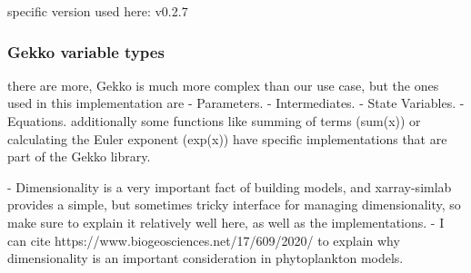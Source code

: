 specific version used here: v0.2.7

\subsubsection{Gekko variable types}
there are more, Gekko is much more complex than our use case, but the ones used in this implementation are
- Parameters. 
- Intermediates. 
- State Variables.  
- Equations.
additionally some functions like summing of terms (sum(x)) or calculating the Euler exponent (exp(x)) have specific implementations that are part of the Gekko library.




- Dimensionality is a very important fact of building models, and xarray-simlab provides a simple, but sometimes tricky interface for managing dimensionality, so make sure to explain it relatively well here, as well as the implementations.
- I can cite https://www.biogeosciences.net/17/609/2020/ to explain why dimensionality is an important consideration in phytoplankton models.